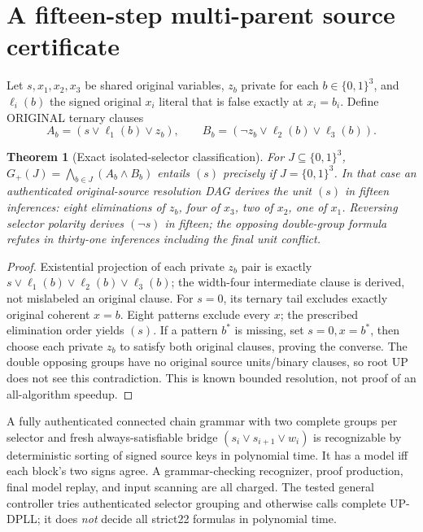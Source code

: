 \documentclass[10pt]{article}
\newtheorem{theorem}{Theorem}
\begin{document}
\section{A fifteen-step multi-parent source certificate}
Let $s,x_1,x_2,x_3$ be shared original variables, $z_b$ private for each $b\in\{0,1\}^3$, and $\ell_i(b)$ the signed original $x_i$ literal that is false exactly at $x_i=b_i$. Define ORIGINAL ternary clauses
\[
 A_b=(s\vee \ell_1(b)\vee z_b),\qquad
 B_b=(\neg z_b\vee\ell_2(b)\vee\ell_3(b)).
\]
\begin{theorem}[Exact isolated-selector classification]
For $J\subseteq\{0,1\}^3$, $G_+(J)=\bigwedge_{b\in J}(A_b\wedge B_b)$ entails $(s)$ precisely if $J=\{0,1\}^3$. In that case an authenticated original-source resolution DAG derives the unit $(s)$ in fifteen inferences: eight eliminations of $z_b$, four of $x_3$, two of $x_2$, one of $x_1$. Reversing selector polarity derives $(\neg s)$ in fifteen; the opposing double-group formula refutes in thirty-one inferences including the final unit conflict.
\end{theorem}
\begin{proof}
Existential projection of each private $z_b$ pair is exactly $s\vee\ell_1(b)\vee\ell_2(b)\vee\ell_3(b)$; the width-four intermediate clause is derived, not mislabeled an original clause. For $s=0$, its ternary tail excludes exactly original coherent $x=b$. Eight patterns exclude every $x$; the prescribed elimination order yields $(s)$. If a pattern $b^\ast$ is missing, set $s=0,x=b^\ast$, then choose each private $z_b$ to satisfy both original clauses, proving the converse. The double opposing groups have no original source units/binary clauses, so root UP does not see this contradiction. This is known bounded resolution, not proof of an all-algorithm speedup.
\end{proof}
A fully authenticated connected chain grammar with two complete groups per selector and fresh always-satisfiable bridge $(s_i\vee s_{i+1}\vee w_i)$ is recognizable by deterministic sorting of signed source keys in polynomial time. It has a model iff each block's two signs agree. A grammar-checking recognizer, proof production, final model replay, and input scanning are all charged. The tested general controller tries authenticated selector grouping and otherwise calls complete UP-DPLL; it does \emph{not} decide all strict22 formulas in polynomial time.
\end{document}
